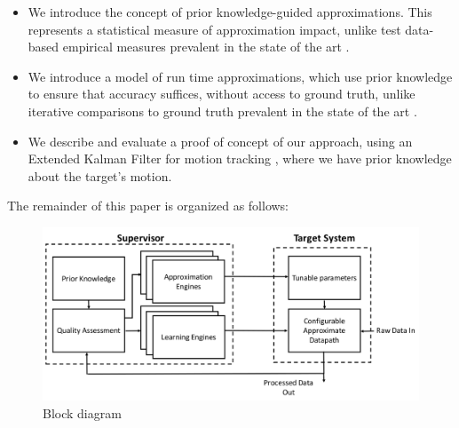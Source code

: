 \begin{itemize}
\item	We introduce the concept of prior knowledge-guided approximations. This represents a statistical measure of approximation impact, unlike test data-based empirical measures prevalent in the state of the art \cite{zhang2014approxit}.
\item	We introduce a model of run time approximations, which use prior knowledge to ensure that accuracy suffices, without access to ground truth, unlike iterative comparisons to ground truth prevalent in the state of the art \cite{han2013approximate}.
\item 	We describe and evaluate a proof of concept of our approach, using an Extended Kalman Filter for motion tracking \cite{kulikov2016accurate}, where we have prior knowledge about the target's motion. 
\end{itemize}

\par The remainder of this paper is organized as follows: 


\begin{figure}[tb]
  \centering
  \includegraphics[width=\columnwidth]{img/block_diagram.png}
  \caption{Block diagram}
  \label{fig:block_diagram}
\end{figure}
